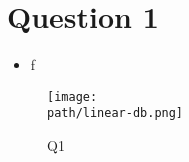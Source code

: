 
\section{Question 1}

\begin{itemize}
    \item  f
\end{itemize}

\begin{solve}    

    \begin{figure}[H]
        \texttt{[image: \\path/linear-db.png]}
        \caption{Q1}
        \label{fig:Q1}
    \end{figure}
\end{solve}
